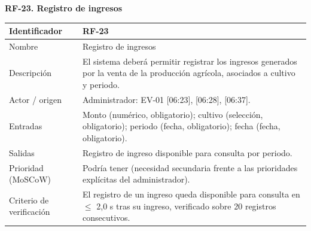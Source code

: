 \documentclass[12pt,a4paper]{article}
\begin{document}
\begin{minipage}{\linewidth}
\bigskip
\noindent\textbf{RF-23. Registro de ingresos}
\label{tab:RF-23}

\begin{center}
\begin{tabular}{|p{3.5cm}|p{10.7cm}|}
\hline
Identificador & RF-23 \\
\hline
Nombre & Registro de ingresos \\
\hline
Descripción & El sistema deberá permitir registrar los ingresos generados por la venta de la producción agrícola, asociados a cultivo y periodo. \\
\hline
Actor / origen & Administrador: EV-01 [06:23], [06:28], [06:37]. \\
\hline
Entradas & Monto (numérico, obligatorio); cultivo (selección, obligatorio); periodo (fecha, obligatorio); fecha (fecha, obligatorio). \\
\hline
Salidas & Registro de ingreso disponible para consulta por periodo. \\
\hline
Prioridad (MoSCoW) & Podría tener (necesidad secundaria frente a las prioridades explícitas del administrador). \\
\hline
Criterio de verificación & El registro de un ingreso queda disponible para consulta en $\leq$ 2,0 s tras su ingreso, verificado sobre 20 registros consecutivos. \\
\hline
\end{tabular}
\end{center}
\end{minipage}
\end{document}
